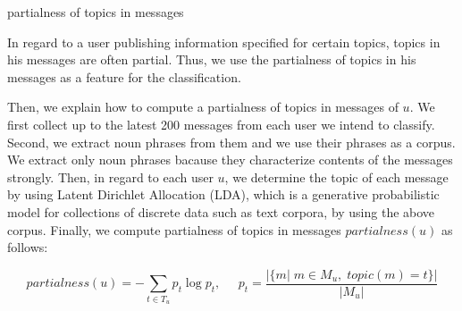 \begin{description}
\bf {\item[(iv)] partialness of topics in messages}
\end{description}

In regard to a user publishing information specified for certain topics,
topics in his messages are often partial.  Thus, we use the
partialness of topics in his messages as a feature for the
classification.

Then, we explain how to compute a partialness of topics in messages of
$u$.  We first collect up to the latest 200 messages from each user we
intend to classify.  Second,
we extract noun phrases from them and we use their phrases as a corpus.
We extract only noun phrases bacause they characterize contents of the
messages strongly.  Then, in regard to each user $u$, we determine the
topic of each message by
using Latent Dirichlet Allocation (LDA), which is a generative
probabilistic model for collections of discrete data such as text
corpora, by using the above corpus.  Finally, we compute partialness of
topics in messages $\mathit{partialness}(u)$ as follows:

\vspace{-3ex}
\[
 \mathit{partialness}(u) = - \sum_{t \in T_u} p_t \log p_t,\;\;\;\;\;
 p_t = \frac{|\{m|\;m \in M_u,\;\mathit{topic}(m) = t\}|}{|M_u|}
\]
\vspace{-3ex}

